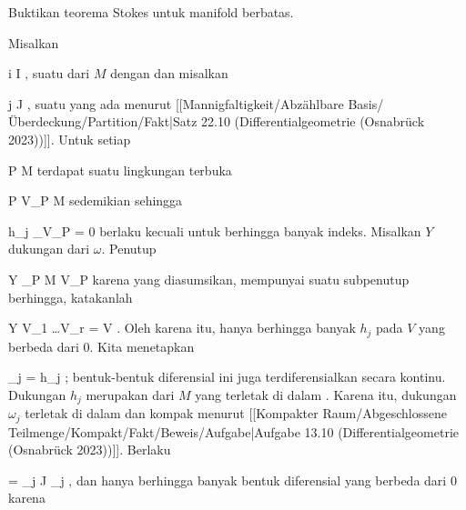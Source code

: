 {

Buktikan teorema Stokes untuk manifold berbatas.

}
{

\teilbeweis {}{}{}
{Misalkan

 {}
 {i \in I} {}
 {} {} {} {,}
suatu
dari $M$ dengan
dan misalkan

 {}
 {j \in J} {}
 {} {} {} {,}
suatu
yang ada menurut
[[Mannigfaltigkeit/Abzählbare Basis/Überdeckung/Partition/Fakt|Satz 22.10 (Differentialgeometrie (Osnabrück 2023))]]. Untuk setiap

\mavergleichskette
{\vergleichskette
{ P
}
{ \in }{ M
}
{  }{
}
{    }{
}
{   }{
}
}
{}{}{}
terdapat suatu lingkungan terbuka

\mavergleichskette
{\vergleichskette
{ P
}
{ \in }{ V_P
}
{ \subseteq }{ M
}
{    }{
}
{   }{
}
}
{}{}{}
sedemikian sehingga

\mavergleichskette
{\vergleichskette
{ h_j \vert_{V_P }
}
{ = }{ 0
}
{ }{
}
{ }{
}
{ }{
}
}
{}{}{}
berlaku kecuali untuk berhingga banyak indeks. Misalkan $Y$ dukungan dari $\omega$. Penutup

\mavergleichskette
{\vergleichskette
{ Y
}
{ \subseteq }{ \bigcup_{P \in M} V_P
}
{  }{
}
{    }{
}
{   }{
}
}
{}{}{}
karena
yang diasumsikan, mempunyai suatu subpenutup berhingga, katakanlah

\mavergleichskettedisp
{\vergleichskette
{ Y
}
{ \subseteq} { V_{1} \cup \ldots \cup V_{r}
}
{ =} { V
}
{ } {
}
{ } {
}
}
{}{}{.}
Oleh karena itu, hanya berhingga banyak $h_j$ pada $V$ yang berbeda dari $0$. Kita menetapkan

\mavergleichskette
{\vergleichskette
{ \omega_j
}
{ = }{ h_j \omega
}
{  }{
}
{    }{
}
{   }{
}
}
{}{}{;}
bentuk-bentuk diferensial ini juga terdiferensialkan secara kontinu. Dukungan $h_j$ merupakan
dari $M$ yang terletak di dalam
. Karena itu, dukungan $\omega_j$ terletak di dalam
 dan kompak menurut
[[Kompakter Raum/Abgeschlossene Teilmenge/Kompakt/Fakt/Beweis/Aufgabe|Aufgabe 13.10 (Differentialgeometrie (Osnabrück 2023))]].
Berlaku

\mavergleichskettedisp
{\vergleichskette
{ \omega
}
{ =} { \sum_{j \in J} \omega_j
}
{ } {
}
{ } {
}
{ } {
}
}
{}{}{,}
dan hanya berhingga banyak bentuk diferensial
 yang berbeda dari $0$ karena

}}
